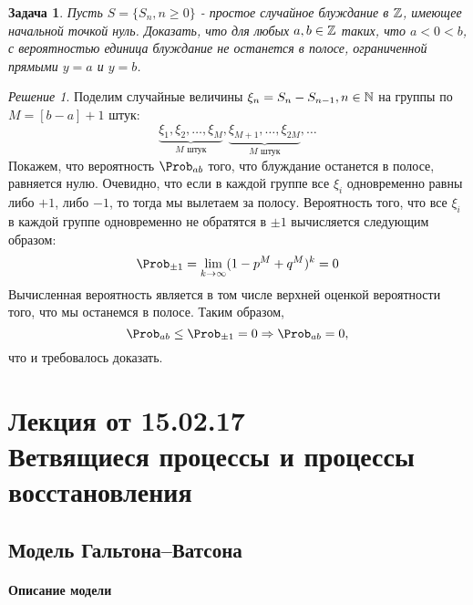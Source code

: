 \documentclass[a4paper]{article}
\newcommand{\nat}{\ensuremath\mathbb N}
\newcommand{\whole}{\ensuremath\mathbb Z}
\theoremstyle{plain}
\newtheorem{prob}{Задача}[section]
\theoremstyle{definition}
\theoremstyle{remark}
\theoremstyle{nonumberplain}
\theoremstyle{nonumberplain}
\newtheorem{solution}{Решение}
\begin{document}
\begin{prob}
	Пусть $S = \{S_n, n\geq 0\}$ - простое случайное блуждание в $\whole$, имеющее начальной точкой нуль. Доказать, что для любых $a,b\in			\whole$ таких, что $a<0<b$, с вероятностью единица блуждание не останется в полосе, ограниченной прямыми $y = a$ и $y = b$.
\end{prob}
\begin{solution}
	Поделим случайные величины $\xi_n = S_n - S_{n-1}, n \in \nat$ на группы по $M = \left[b-a\right] + 1$ штук:
	\begin{equation*}
		\underbrace{\xi_1, \xi_2, \ldots, \xi_M}_{M\text{ штук}}, \underbrace{\xi_{M+1}, \ldots,\xi_{2M}}_{M\text{ штук}}, \ldots
	\end{equation*}
Покажем, что вероятность $\Prob_{ab}$ того, что блуждание останется в полосе, равняется нулю. Очевидно, что если в каждой группе все $\xi_i$ одновременно равны либо $+1$, либо $-1$, то тогда мы вылетаем за полосу. Вероятность того, что все $\xi_i$ в каждой группе одновременно не обратятся в $\pm 1$ вычисляется следующим образом:
		\begin{equation*}
			\Prob_{\pm 1} = \lim_{k \rightarrow \infty} (1 - p^M + q^M)^k = 0
		\end{equation*}
	Вычисленная вероятность является в том числе верхней оценкой вероятности того, что мы останемся в полосе. Таким образом,
	\begin{equation*}
		\Prob_{ab} \leq \Prob_{\pm 1} = 0 \Rightarrow \Prob_{ab} = 0,
	\end{equation*}
	что и требовалось доказать.
\end{solution}

\section[Лекция от 15.02.17. Ветвящиеся процессы и процессы восстановления]{Лекция от 15.02.17\\ {\large Ветвящиеся процессы и процессы восстановления}}

\subsection{Модель Гальтона--Ватсона}

\paragraph{Описание модели}
\end{document}
